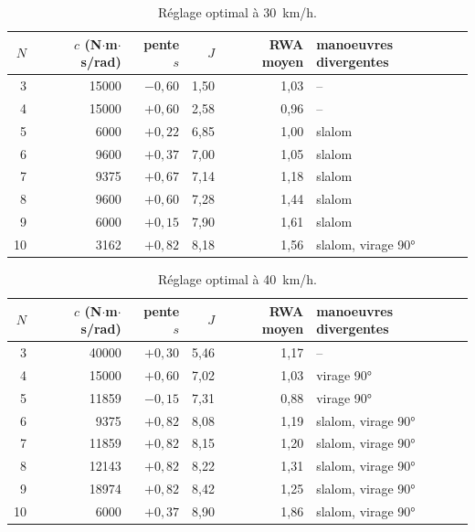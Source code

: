 \begin{table}[ht]\centering\small
\begin{tabular}{@{}r r r r r l@{}}\toprule
$N$ & $c$ (N$\cdot$m$\cdot$s/rad) & pente $s$ & $J$ & RWA moyen & manoeuvres divergentes\\\midrule
3 & 15000 & $-0{,}60$ & 1{,}50 & 1{,}03 & --\\
4 & 15000 & $+0{,}60$ & 2{,}58 & 0{,}96 & --\\
5 & 6000 & $+0{,}22$ & 6{,}85 & 1{,}00 & slalom\\
6 & 9600 & $+0{,}37$ & 7{,}00 & 1{,}05 & slalom\\
7 & 9375 & $+0{,}67$ & 7{,}14 & 1{,}18 & slalom\\
8 & 9600 & $+0{,}60$ & 7{,}28 & 1{,}44 & slalom\\
9 & 6000 & $+0{,}15$ & 7{,}90 & 1{,}61 & slalom\\
10 & 3162 & $+0{,}82$ & 8{,}18 & 1{,}56 & slalom, virage 90°\\
\bottomrule\end{tabular}
\caption{Réglage optimal à \SI{30}{km/h}.}\label{tab:opt30}\end{table}

\begin{table}[ht]\centering\small
\begin{tabular}{@{}r r r r r l@{}}\toprule
$N$ & $c$ (N$\cdot$m$\cdot$s/rad) & pente $s$ & $J$ & RWA moyen & manoeuvres divergentes\\\midrule
3 & 40000 & $+0{,}30$ & 5{,}46 & 1{,}17 & --\\
4 & 15000 & $+0{,}60$ & 7{,}02 & 1{,}03 & virage 90°\\
5 & 11859 & $-0{,}15$ & 7{,}31 & 0{,}88 & virage 90°\\
6 & 9375 & $+0{,}82$ & 8{,}08 & 1{,}19 & slalom, virage 90°\\
7 & 11859 & $+0{,}82$ & 8{,}15 & 1{,}20 & slalom, virage 90°\\
8 & 12143 & $+0{,}82$ & 8{,}22 & 1{,}31 & slalom, virage 90°\\
9 & 18974 & $+0{,}82$ & 8{,}42 & 1{,}25 & slalom, virage 90°\\
10 & 6000 & $+0{,}37$ & 8{,}90 & 1{,}86 & slalom, virage 90°\\
\bottomrule\end{tabular}
\caption{Réglage optimal à \SI{40}{km/h}.}\label{tab:opt40}\end{table}
